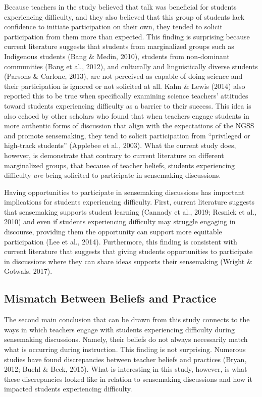 \documentclass{sig-alternate} %
\begin{document}
\begin{large}
Because teachers in the study believed that talk was beneficial for students experiencing difficulty, and they also believed that this group of students lack confidence to initiate participation on their own, they tended to solicit participation from them more than expected. This finding is surprising because current literature suggests that students from marginalized groups such as Indigenous students (Bang \& Medin, 2010), students from non-dominant communities (Bang et al., 2012), and culturally and linguistically diverse students (Parsons \& Carlone, 2013), are not perceived as capable of doing science and their participation is ignored or not solicited at all. Kahn \& Lewis (2014) also reported this to be true when specifically examining science teachers' attitudes toward students experiencing difficulty as a barrier to their success. This idea is also echoed by other scholars who found that when teachers engage students in more authentic forms of discussion that align with the expectations of the NGSS and promote sensemaking, they tend to solicit participation from “privileged or high-track students” (Applebee et al., 2003). What the current study does, however, is demonstrate that contrary to current literature on different marginalized groups, that because of teacher beliefs, students experiencing difficulty \textit{are} being solicited to participate in sensemaking discussions.

Having opportunities to participate in sensemaking discussions has important implications for students experiencing difficulty. First, current literature suggests that sensemaking supports student learning (Cannady et al., 2019; Resnick et al., 2010) and even if students experiencing difficulty may struggle engaging in discourse, providing them the opportunity can support more equitable participation (Lee et al., 2014). Furthermore, this finding is consistent with current literature that suggests that giving students opportunities to participate in discussions where they can share ideas supports their sensemaking (Wright \& Gotwals, 2017).

\subsection*{Mismatch Between Beliefs and Practice}

The second main conclusion that can be drawn from this study connects to the ways in which teachers engage with students experiencing difficulty during sensemaking discussions. Namely, their beliefs do not always necessarily match what is occurring during instruction. This finding is not surprising. Numerous studies have found discrepancies between teacher beliefs and practices (Bryan, 2012; Buehl \& Beck, 2015). What is interesting in this study, however, is what these discrepancies looked like in relation to sensemaking discussions and how it impacted students experiencing difficulty. 


\end{large}
\end{document}

